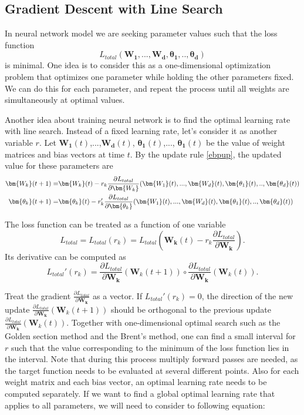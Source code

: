 \subsection{Gradient Descent with Line Search}

In neural network model we are seeking parameter values such that the loss function 
$$L_{total}(\bm{W_1},...,\bm{W_d},\bm{\theta_1},..,\bm{\theta_d})$$
is minimal. One idea is to consider this as a one-dimensional optimization problem that optimizes one parameter while holding the other parameters fixed. We can do this for each parameter, and repeat the process until all weights are simultaneously at optimal values.

Another idea about training neural network is to find the optimal learning rate with line search. Instead of a fixed learning rate, let's consider it as another variable $r$. Let $\bm{W_1}(t)$,...,$\bm{W_d}(t)$, $\bm{\theta_1}(t)$,..., $\bm{\theta_1}(t)$ be the value of weight matrices and bias vectors at time $t$. By the update rule \eqref{ebpup}, the updated value for these parameters are
\begin{equation}
\aligned
\bm{W_k}(t+1) =& \bm{W_k}(t) - r_k\frac{\partial L_{total}}{\partial \bm{W_k}}(\bm{W_1}(t),...,\bm{W_d}(t),\bm{\theta_1}(t),..,\bm{\theta_d}(t))\\
\bm{\theta_k}(t+1) =& \bm{\theta_k}(t) - r_k'\frac{\partial L_{total}}{\partial \bm{\theta_k}}(\bm{W_1}(t),...,\bm{W_d}(t),\bm{\theta_1}(t),..,\bm{\theta_d}(t))
\endaligned
\end{equation}

The loss function can be treated as a function of one variable 
$$
L_{total} = L_{total}(r_k) = L_{total}(\bm{W_k}(t) - r_k\frac{\partial L_{total}}{\partial \bm{W_k}}).
$$ 
Its derivative can be computed as
\begin{equation}
L_{total}'(r_k) =\frac{\partial L_{total}}{\partial \bm{W_k}}(\bm W_k(t+1))\circ \frac{\partial L_{total}}{\partial \bm{W_k}}(\bm W_k(t)).
\end{equation}

Treat the gradient $\frac{\partial L_{total}}{\partial \bm{W_k}}$ as a vector. If $L_{total}'(r_k) =0$, the direction of the new update $\frac{\partial L_{total}}{\partial \bm{W_k}}(\bm W_k(t+1))$ should be orthogonal to the previous update $\frac{\partial L_{total}}{\partial \bm{W_k}}(\bm W_k(t))$. Together with one-dimensional optimal search such as the Golden section method and the Brent's method, one can find a small interval for $r$ such that the value corresponding to the minimum of the loss function lies in the interval. Note that during this process multiply forward passes are needed, as the target function needs to be evaluated at several different points. Also for each weight matrix and each bias vector, an optimal learning rate needs to be computed separately. If we want to find a global optimal learning rate that applies to all parameters, we will need to consider to following equation:

